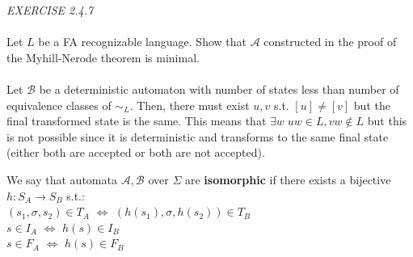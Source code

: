 \documentclass{article}
\begin{document}
\begin{siderules}\color{blue}\textit{EXERCISE 2.4.7}\color{black}\\\\
\color{blue}Let \(L\) be a FA recognizable language. Show that \(\mathcal{A}\) constructed in the proof of the Myhill-Nerode theorem is minimal.\\\\\color{black}
Let \(\mathcal{B}\) be a deterministic automaton with number of states less than number of equivalence classes of \(\sim_{L}\). Then, there must exist \(u,v\) s.t. \([u]\neq [v]\) but the final transformed state is the same.
This means that \(\exists w\;uw\in L,vw\notin L\) but this is not possible since it is deterministic and transforms to the same final state (either both are accepted or both are not accepted).
\end{siderules}
We say that automata \(\mathcal{A},\mathcal{B}\) over \(\Sigma\) are \textbf{isomorphic} if there exists a bijective \(h:S_{A}\to S_{B}\) s.t.:\\
\null\qquad \((s_{1},\sigma,s_{2})\in T_{A}\) \(\Longleftrightarrow\) \((h(s_{1}),\sigma,h(s_{2}))\in T_{B}\)\\
\null\qquad \(s\in I_{A}\) \(\Longleftrightarrow\) \(h(s)\in I_{B}\)\\
\null\qquad \(s\in F_{A}\) \(\Longleftrightarrow\) \(h(s)\in F_{B}\)\\
\end{document}
